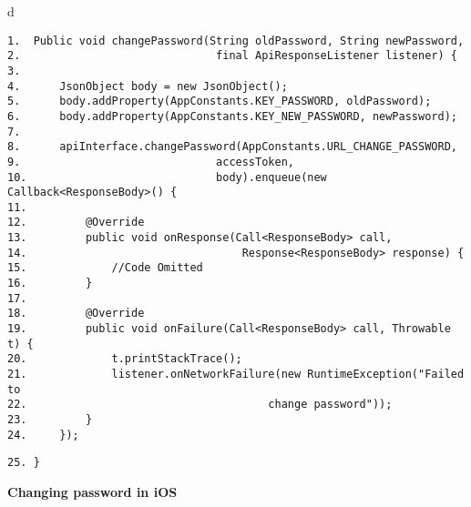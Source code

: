 \documentclass[a4paper,12pt]{book}
\begin{document}

\begin{codebloc}
\begin{tabular}{d}
\vspace{2pt}
\begin{verbatim}
1.  Public void changePassword(String oldPassword, String newPassword,
2.                              final ApiResponseListener listener) {
3.	
4.      JsonObject body = new JsonObject();
5.      body.addProperty(AppConstants.KEY_PASSWORD, oldPassword);
6.      body.addProperty(AppConstants.KEY_NEW_PASSWORD, newPassword);
7.	
8.      apiInterface.changePassword(AppConstants.URL_CHANGE_PASSWORD,
9.                              accessToken, 
10.                             body).enqueue(new Callback<ResponseBody>() {
11.	
12.         @Override
13.         public void onResponse(Call<ResponseBody> call,
14.                                 Response<ResponseBody> response) {
15.             //Code Omitted
16.         }
17.	
18.         @Override
19.         public void onFailure(Call<ResponseBody> call, Throwable t) {
20.             t.printStackTrace();
21.             listener.onNetworkFailure(new RuntimeException("Failed to
22.                                     change password"));
23.         }
24.     });
\end{verbatim}
\verb|25. }|
\end{tabular}
\end{codebloc}

\textbf{Changing password in iOS}

\end{document}
